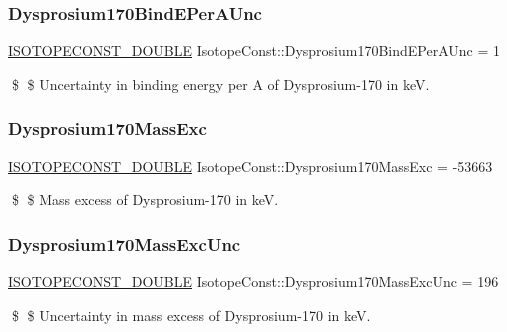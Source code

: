 \subsubsection{\texorpdfstring{Dysprosium170\+Bind\+E\+Per\+A\+Unc}{Dysprosium170BindEPerAUnc}}
{\footnotesize\ttfamily \mbox{\hyperlink{group___isotope_const-_macros_ga8f45a7272ce02c0b4c65c44636ed719a}{I\+S\+O\+T\+O\+P\+E\+C\+O\+N\+S\+T\+\_\+\+D\+O\+U\+B\+LE}} Isotope\+Const\+::\+Dysprosium170\+Bind\+E\+Per\+A\+Unc = 1}

\$ \$ Uncertainty in binding energy per A of Dysprosium-\/170 in keV. \mbox{\label{group___isotope_const-_dysprosium-_dy170_gab721acfc5f22f446b3e32f6b2bb8ffff}} 
\subsubsection{\texorpdfstring{Dysprosium170\+Mass\+Exc}{Dysprosium170MassExc}}
{\footnotesize\ttfamily \mbox{\hyperlink{group___isotope_const-_macros_ga8f45a7272ce02c0b4c65c44636ed719a}{I\+S\+O\+T\+O\+P\+E\+C\+O\+N\+S\+T\+\_\+\+D\+O\+U\+B\+LE}} Isotope\+Const\+::\+Dysprosium170\+Mass\+Exc = -\/53663}

\$ \$ Mass excess of Dysprosium-\/170 in keV. \mbox{\label{group___isotope_const-_dysprosium-_dy170_gaf032bb549fbe7eb13958527d07e1b4d7}} 
\subsubsection{\texorpdfstring{Dysprosium170\+Mass\+Exc\+Unc}{Dysprosium170MassExcUnc}}
{\footnotesize\ttfamily \mbox{\hyperlink{group___isotope_const-_macros_ga8f45a7272ce02c0b4c65c44636ed719a}{I\+S\+O\+T\+O\+P\+E\+C\+O\+N\+S\+T\+\_\+\+D\+O\+U\+B\+LE}} Isotope\+Const\+::\+Dysprosium170\+Mass\+Exc\+Unc = 196}

\$ \$ Uncertainty in mass excess of Dysprosium-\/170 in keV. \mbox{\label{group___isotope_const-_dysprosium-_dy170_ga509a31c264b41833175a6523d89b4973}} 
